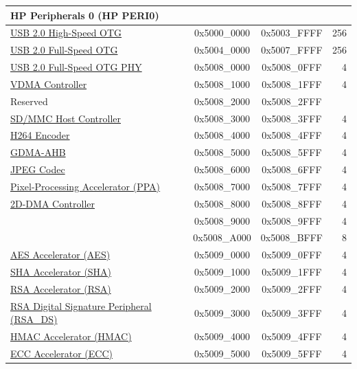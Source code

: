 \begin{ThreePartTable}
\begin{longtable}[c]{ |p{7cm}|c|c|r| }
\multicolumn{4}{|l|}{\textbf{HP Peripherals 0 (HP PERI0)}} \\ \hline
\hyperref[mod:usbotghs]{USB 2.0 High-Speed OTG}          & 0x5000\_0000 & 0x5003\_FFFF &   256\\\hline
\hyperref[mod:usbotgfs]{USB 2.0 Full-Speed OTG}          & 0x5004\_0000 & 0x5007\_FFFF &   256\\\hline
\hyperref[mod:usbotgfs]{USB 2.0 Full-Speed OTG PHY}           & 0x5008\_0000 & 0x5008\_0FFF &   4\\\hline
\hyperref[mod:vdma]{VDMA Controller}           & 0x5008\_1000 & 0x5008\_1FFF &   4\\\hline
\rowcolor{gray!25}  Reserved                   & 0x5008\_2000 & 0x5008\_2FFF &   \\\hline
\hyperref[mod:sdhost]{SD/MMC Host Controller}           & 0x5008\_3000 & 0x5008\_3FFF &   4\\\hline
\hyperref[mod:h264enc]{H264 Encoder}           & 0x5008\_4000 & 0x5008\_4FFF &   4\\\hline
\hyperref[mod:dma]{GDMA-AHB}           & 0x5008\_5000 & 0x5008\_5FFF &   4\\\hline
\hyperref[mod:jpegcodec]{JPEG Codec}           & 0x5008\_6000 & 0x5008\_6FFF &   4\\\hline
\hyperref[mod:ppa]{Pixel-Processing Accelerator (PPA)}           & 0x5008\_7000 & 0x5008\_7FFF &   4\\\hline
\hyperref[mod:2ddma]{2D-DMA Controller}           & 0x5008\_8000 & 0x5008\_8FFF &   4\\\hline
\tagged{ESP32-P4-latest}{
    \hyperref[mod:keymng]{Key Manager}           & 0x5008\_9000 & 0x5008\_9FFF &   4\\\hline
}
\hyperref[mod:dma]{GDMA-AXI}           & 0x5008\_A000 & 0x5008\_BFFF &   8\\\hline
\hyperref[mod:aes]{AES Accelerator (AES)}      & 0x5009\_0000 & 0x5009\_0FFF &   4\\\hline
\hyperref[mod:sha]{SHA Accelerator (SHA)}      & 0x5009\_1000 & 0x5009\_1FFF &   4\\\hline
\hyperref[mod:rsa]{RSA Accelerator (RSA)}      & 0x5009\_2000 & 0x5009\_2FFF &   4\\\hline
\hyperref[mod:digsig]{RSA Digital Signature Peripheral (RSA\_DS)}  & 0x5009\_3000 & 0x5009\_3FFF &   4\\\hline
\hyperref[mod:hmac]{HMAC Accelerator (HMAC)}   & 0x5009\_4000 & 0x5009\_4FFF &   4\\\hline
\hyperref[mod:ecc]{ECC Accelerator (ECC)}      & 0x5009\_5000 & 0x5009\_5FFF &   4\\\hline

\end{longtable}
\end{ThreePartTable}
